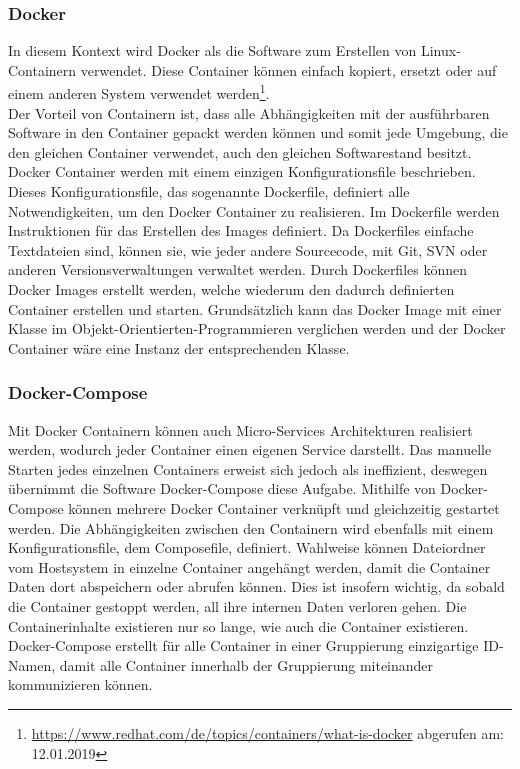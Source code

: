 \subsubsection{Docker}
In diesem Kontext wird Docker als die Software zum Erstellen von Linux-Containern verwendet.
Diese Container können einfach kopiert, ersetzt oder auf einem anderen System verwendet werden\footnote{\url{https://www.redhat.com/de/topics/containers/what-is-docker} abgerufen am: 12.01.2019}.\\
Der Vorteil von Containern ist, dass alle Abhängigkeiten mit der ausführbaren Software in den Container gepackt werden können und somit jede Umgebung, die den gleichen Container verwendet, auch den gleichen Softwarestand besitzt.
Docker Container werden mit einem einzigen Konfigurationsfile beschrieben.
Dieses Konfigurationsfile, das sogenannte Dockerfile, definiert alle Notwendigkeiten, um den Docker Container zu realisieren.
Im Dockerfile werden Instruktionen für das Erstellen des Images definiert.
Da Dockerfiles einfache Textdateien sind, können sie, wie jeder andere Sourcecode, mit Git, SVN oder anderen Versionsverwaltungen verwaltet werden.
Durch Dockerfiles können Docker Images erstellt werden, welche wiederum den dadurch definierten Container erstellen und starten.
Grundsätzlich kann das Docker Image mit einer Klasse im Objekt-Orientierten-Programmieren verglichen werden und der Docker Container wäre eine Instanz der entsprechenden Klasse. 
\subsubsection{Docker-Compose}
Mit Docker Containern können auch Micro-Services Architekturen realisiert werden, wodurch jeder Container einen eigenen Service darstellt.
Das manuelle Starten jedes einzelnen Containers erweist sich jedoch als ineffizient, deswegen übernimmt die Software \glqq Docker-Compose\grqq{} diese Aufgabe.
Mithilfe von Docker-Compose können mehrere Docker Container verknüpft und gleichzeitig gestartet werden.
Die Abhängigkeiten zwischen den Containern wird ebenfalls mit einem Konfigurationsfile, dem Composefile, definiert.
Wahlweise können Dateiordner vom Hostsystem in einzelne Container angehängt werden, damit die Container Daten dort abspeichern oder abrufen können.
Dies ist insofern wichtig, da sobald die Container gestoppt werden, all ihre internen Daten verloren gehen.
Die Containerinhalte existieren nur so lange, wie auch die Container existieren.
Docker-Compose erstellt für alle Container in einer Gruppierung einzigartige ID-Namen, damit alle Container innerhalb der Gruppierung miteinander kommunizieren können.
